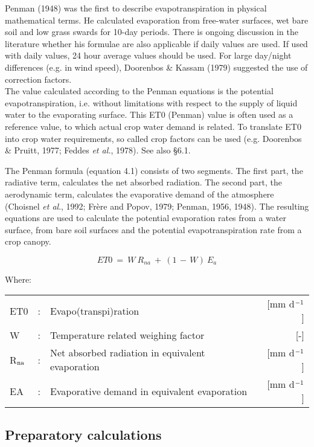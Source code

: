 Penman (1948) was the first to describe evapotranspiration in physi\-cal mathematical
terms. He calculated evaporation from free-water surfaces, wet bare soil and low grass
swards for 10-day periods. There is ongoing discussion in the literature whether his
formulae are also applicable if daily values are used. If used with daily values, 24 hour
average values should be used. For large day/night differences (e.g. in wind speed),
Dooren\-bos \& Kassam (1979) suggested the use of correction factors.\\
The value calculated according to the Penman equations is the potential evapo\-{\nobreak}transpiration, i.e. without limitations with respect to the supply of liquid water to the
evaporating surface. This ET0 (Penman) value is often used as a reference value, to
which actual crop water demand is related. To translate ET0 into crop water require\-ments,
 so called crop factors can be used (e.g. Doorenbos \& Pruitt, 1977; Feddes {\it et al.\/},
1978). See also \S 6.1.

The Penman formula (equation 4.1) consists of two segments. The first part, the radiative
term, calculates the net absorbed radiation. The second part, the aerodynamic term,
calculates the evapora\-tive demand of the atmo\-sphere (Choisnel {\it et al\/}., 1992; Fr\`{e}re and
Popov, 1979; Penman, 1956, 1948). The resulting equations are used to calculate the
potential evapora\-tion rates from a water surface, from bare soil surfaces and the potential
evapotranspira\-tion rate from a crop canopy.


\begin{equation}
\label{eqET0}
ET0 ~=~ W ~R _{na} ~+~(1\, -\, W) ~E _{a} 
\end{equation}

Where:\\
\begin{tabularx}{\textwidth}{llXr}
ET0&:& Evapo(transpi)ration & [mm d$^{{\rm -1}}$] \\
W&:& Temperature related weighing factor &  [-] \\
R$_{{\rm na}}$&: & Net absorbed radiation in equivalent evaporation & [mm d$^{{\rm -1}}$] \\
EA&: &  Evaporative demand in equivalent evaporation & [mm d$^{{\rm -1}}$] \\
\end{tabularx}

\subsection{Preparatory calculations}

